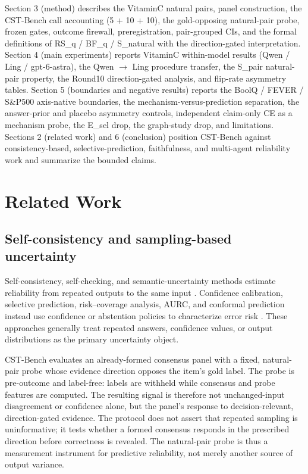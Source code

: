 \documentclass[11pt]{article}
\begin{document}
Section 3 (method) describes the VitaminC natural pairs, panel construction, the CST-Bench call accounting (5 + 10 + 10), the gold-opposing natural-pair probe, frozen gates, outcome firewall, preregistration, pair-grouped CIs, and the formal definitions of RS\_\allowbreak{}q / BF\_\allowbreak{}q / S\_\allowbreak{}natural with the direction-gated interpretation. Section 4 (main experiments) reports VitaminC within-model results (Qwen / Ling / gpt-6-astra), the Qwen $\to$ Ling procedure transfer, the S\_\allowbreak{}pair natural-pair property, the Round10 direction-gated analysis, and flip-rate asymmetry tables. Section 5 (boundaries and negative results) reports the BoolQ / FEVER / S\&P500 axis-native boundaries, the mechanism-versus-prediction separation, the answer-prior and placebo asymmetry controls, independent claim-only CE as a mechanism probe, the E\_\allowbreak{}sel drop, the graph-study drop, and limitations. Sections 2 (related work) and 6 (conclusion) position CST-Bench against consistency-based, selective-prediction, faithfulness, and multi-agent reliability work and summarize the bounded claims.

\section{Related Work}

\subsection{Self-consistency and sampling-based uncertainty}

Self-consistency, self-checking, and semantic-uncertainty methods estimate reliability from repeated outputs to the same input \citep{wang-etal-2022-self-consistency,manakul-etal-2023-selfcheckgpt,kuhn-etal-2023-semantic-uncertainty}. Confidence calibration, selective prediction, risk--coverage analysis, AURC, and conformal prediction instead use confidence or abstention policies to characterize error risk \citep{guo-etal-2017-calibration,geifman-elyaniv-2017-selective,angelopoulos-bates-2021-conformal}. These approaches generally treat repeated answers, confidence values, or output distributions as the primary uncertainty object.

CST-Bench evaluates an already-formed consensus panel with a fixed, natural-pair probe whose evidence direction opposes the item's gold label. The probe is pre-outcome and label-free: labels are withheld while consensus and probe features are computed. The resulting signal is therefore not unchanged-input disagreement or confidence alone, but the panel's response to decision-relevant, direction-gated evidence. The protocol does not assert that repeated sampling is uninformative; it tests whether a formed consensus responds in the prescribed direction before correctness is revealed. The natural-pair probe is thus a measurement instrument for predictive reliability, not merely another source of output variance.
\end{document}
